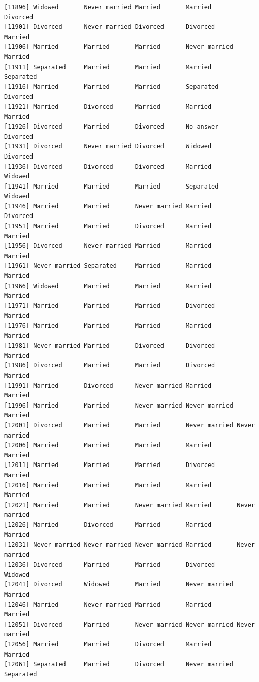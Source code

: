 \documentclass[
  letterpaper,
  DIV=11,
  numbers=noendperiod,
  oneside]{scrartcl}
\begin{document}
\begin{verbatim}
[11896] Widowed       Never married Married       Married       Divorced     
[11901] Divorced      Never married Divorced      Divorced      Married      
[11906] Married       Married       Married       Never married Married      
[11911] Separated     Married       Married       Married       Separated    
[11916] Married       Married       Married       Separated     Divorced     
[11921] Married       Divorced      Married       Married       Married      
[11926] Divorced      Married       Divorced      No answer     Divorced     
[11931] Divorced      Never married Divorced      Widowed       Divorced     
[11936] Divorced      Divorced      Divorced      Married       Widowed      
[11941] Married       Married       Married       Separated     Widowed      
[11946] Married       Married       Never married Married       Divorced     
[11951] Married       Married       Divorced      Married       Married      
[11956] Divorced      Never married Married       Married       Married      
[11961] Never married Separated     Married       Married       Married      
[11966] Widowed       Married       Married       Married       Married      
[11971] Married       Married       Married       Divorced      Married      
[11976] Married       Married       Married       Married       Married      
[11981] Never married Married       Divorced      Divorced      Married      
[11986] Divorced      Married       Married       Divorced      Married      
[11991] Married       Divorced      Never married Married       Married      
[11996] Married       Married       Never married Never married Married      
[12001] Divorced      Married       Married       Never married Never married
[12006] Married       Married       Married       Married       Married      
[12011] Married       Married       Married       Divorced      Married      
[12016] Married       Married       Married       Married       Married      
[12021] Married       Married       Never married Married       Never married
[12026] Married       Divorced      Married       Married       Married      
[12031] Never married Never married Never married Married       Never married
[12036] Divorced      Married       Married       Divorced      Widowed      
[12041] Divorced      Widowed       Married       Never married Married      
[12046] Married       Never married Married       Married       Married      
[12051] Divorced      Married       Never married Never married Never married
[12056] Married       Married       Divorced      Married       Married      
[12061] Separated     Married       Divorced      Never married Separated    

\end{verbatim}
\end{document}
